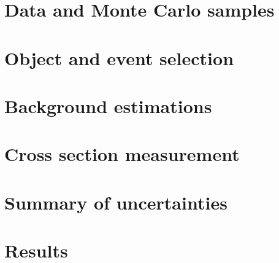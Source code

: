 \section{Data and Monte Carlo samples}\label{ssww13tev:data_mc}


\section{Object and event selection}\label{ssww13tev:object_event_selection}


%

\section{Background estimations}\label{ssww13tev:background}


\section{Cross section measurement}\label{ssww13tev:xsec}


\section{Summary of uncertainties}\label{ssww13tev:uncertainty}


\section{Results}\label{ssww13tev:results}



